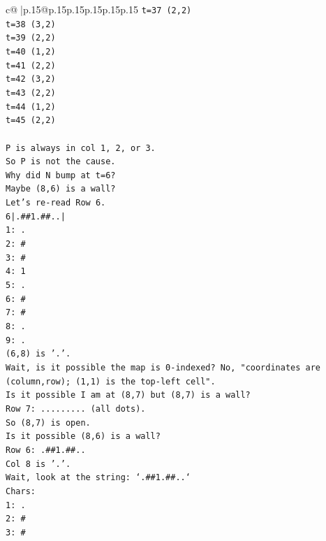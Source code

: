 \documentclass{article}
\begin{document}
{\begin{supertabular}{c@{$\;$}|p{.15\linewidth}@{}p{.15\linewidth}p{.15\linewidth}p{.15\linewidth}p{.15\linewidth}p{.15\linewidth}}
{{{\texttt{t=37 (2,2)} \\
\texttt{t=38 (3,2)} \\
\texttt{t=39 (2,2)} \\
\texttt{t=40 (1,2)} \\
\texttt{t=41 (2,2)} \\
\texttt{t=42 (3,2)} \\
\texttt{t=43 (2,2)} \\
\texttt{t=44 (1,2)} \\
\texttt{t=45 (2,2)} \\
\\ 
\texttt{P is always in col 1, 2, or 3.} \\
\texttt{So P is not the cause.} \\
\texttt{Why did N bump at t=6?} \\
\texttt{Maybe (8,6) is a wall?} \\
\texttt{Let's re{-}read Row 6.} \\
\texttt{6|.\#\#1.\#\#..|} \\
\texttt{1: .} \\
\texttt{2: \#} \\
\texttt{3: \#} \\
\texttt{4: 1} \\
\texttt{5: .} \\
\texttt{6: \#} \\
\texttt{7: \#} \\
\texttt{8: .} \\
\texttt{9: .} \\
\texttt{(6,8) is '.'.} \\
\texttt{Wait, is it possible the map is 0{-}indexed? No, "coordinates are (column,row); (1,1) is the top{-}left cell".} \\
\texttt{Is it possible I am at (8,7) but (8,7) is a wall?} \\
\texttt{Row 7: ......... (all dots).} \\
\texttt{So (8,7) is open.} \\
\texttt{Is it possible (8,6) is a wall?} \\
\texttt{Row 6: .\#\#1.\#\#..} \\
\texttt{Col 8 is '.'.} \\
\texttt{Wait, look at the string: `.\#\#1.\#\#..`} \\
\texttt{Chars:} \\
\texttt{1: .} \\
\texttt{2: \#} \\
\texttt{3: \#} \\
}}}
\end{supertabular}}
\end{document}
